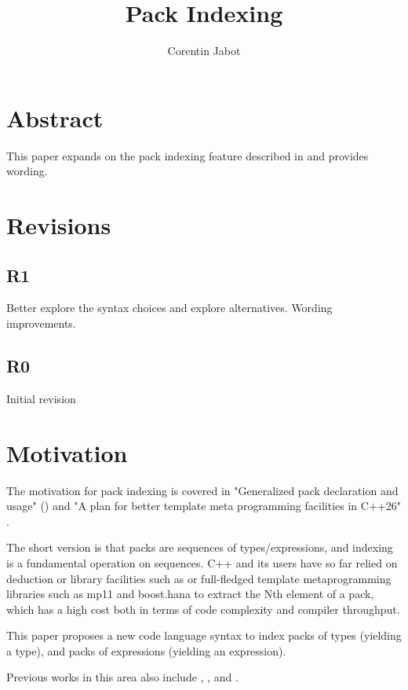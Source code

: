 \documentclass{wg21}
\title{Pack Indexing}
\author{Corentin Jabot}{corentin.jabot@gmail.com}
\begin{document}
\maketitle

\section{Abstract}

This paper expands on the pack indexing feature described in  and provides wording.

\section{Revisions}


\subsection{R1}

Better explore the syntax choices and explore alternatives. Wording improvements.

\subsection{R0}

Initial revision

\section{Motivation}

The motivation for pack indexing is covered in "Generalized pack declaration and usage" () and
"A plan for better template meta programming facilities in C++26" \cite{P2632R0}.

The short version is that packs are sequences of types/expressions, and indexing is a fundamental operation on sequences.
C++ and its users have so far relied on deduction or library facilities such as  or full-fledged template metaprogramming libraries such as
mp11 and boost.hana to extract the Nth element of a pack, which has a high cost both in terms of code complexity and compiler throughput.

This paper proposes a new code language syntax to index packs of types (yielding a type), and packs of expressions (yielding an expression).

Previous works in this area also include , ,  and .
\end{document}
